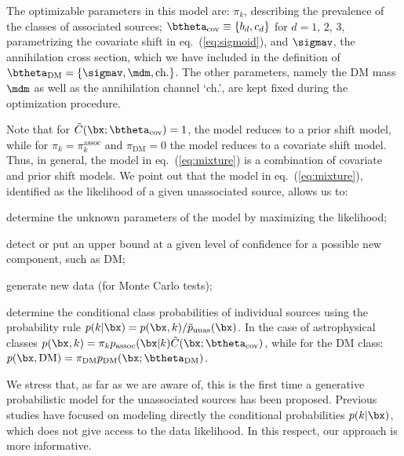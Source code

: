 The optimizable parameters in this model are: $\pi_k$, describing the prevalence of the classes of associated sources; $\btheta_\textrm{cov}\equiv\{b_d,c_d\}$ for $d = 1,\,2,\,3$, parametrizing the covariate shift in eq.~(\ref{eq:sigmoid}), and $\sigmav$, the annihilation cross section, which we have included in the definition of $\btheta_\textrm{DM}=\{\sigmav,\mdm,\textrm{ch.}\}$. The other parameters, namely the DM mass $\mdm$ as well as the annihilation channel `ch.', are kept fixed during the optimization procedure.

Note that for $\tilde{C}(\bx; \btheta_\textrm{cov}) = 1$, the model reduces to a prior shift model, while for $\pi_k = \pi_k^\textrm{assoc}$ and $\pi_\textrm{DM} = 0$ the model reduces to a covariate shift model.
Thus, in general, the model in eq.~(\ref{eq:mixture}) is a combination of covariate and prior shift models. We point out that the model in eq.~(\ref{eq:mixture}), identified as the likelihood of a given unassociated source, allows us to:
\ben
\item
determine the unknown parameters of the model by maximizing the likelihood;
\item
detect or put an upper bound at a given level of confidence for a possible new component, such as DM;
\item
generate new data (for Monte Carlo tests);
\item
determine the conditional class probabilities of individual sources using the probability rule
$p(k|\bx) = p(\bx, k)/\tilde{p}_\textrm{unas}(\bx)$. In the case of astrophysical classes 
$p(\bx, k) = \pi_k p_\textrm{assoc}(\bx|k) \tilde{C}(\bx; \btheta_\textrm{cov})$, while
for the DM class: $p(\bx, \textrm{DM}) = \pi_\textrm{DM} p_\textrm{DM}(\bx; \btheta_\textrm{DM})$.
\een

We stress that, as far as we are aware of, this is the first time a generative probabilistic model for the unassociated sources has been proposed. Previous studies have focused on modeling directly the conditional probabilities $p(k|\bx)$, which does not give access to the data likelihood. In this respect, our approach is more informative.

